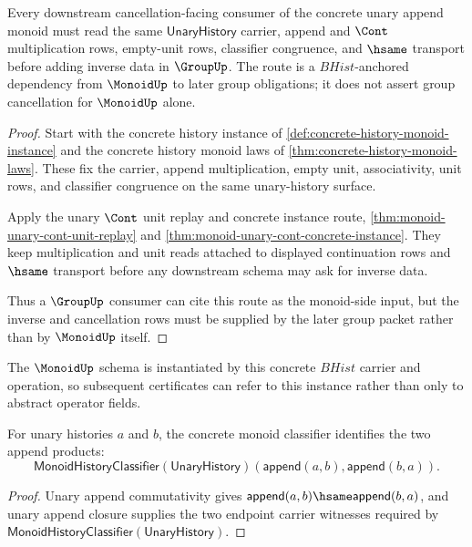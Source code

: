 \begin{theorem}
\label{thm:monoid-unary-cont-cancellation-route}
Every downstream cancellation-facing consumer of the concrete unary append monoid must read the same $\mathsf{UnaryHistory}$ carrier, append and $\Cont$ multiplication rows, empty-unit rows, classifier congruence, and $\hsame$ transport before adding inverse data in $\GroupUp$. The route is a $BHist$-anchored dependency from $\MonoidUp$ to later group obligations; it does not assert group cancellation for $\MonoidUp$ alone.
\end{theorem}
\begin{proof}
Start with the concrete history instance of \autoref{def:concrete-history-monoid-instance} and the concrete history monoid laws of \autoref{thm:concrete-history-monoid-laws}. These fix the carrier, append multiplication, empty unit, associativity, unit rows, and classifier congruence on the same unary-history surface.

Apply the unary $\Cont$ unit replay and concrete instance route, \autoref{thm:monoid-unary-cont-unit-replay} and \autoref{thm:monoid-unary-cont-concrete-instance}. They keep multiplication and unit reads attached to displayed continuation rows and $\hsame$ transport before any downstream schema may ask for inverse data.

Thus a $\GroupUp$ consumer can cite this route as the monoid-side input, but the inverse and cancellation rows must be supplied by the later group packet rather than by $\MonoidUp$ itself.
\end{proof}

The $\MonoidUp$ schema is instantiated by this concrete $BHist$ carrier and
operation, so subsequent certificates can refer to this instance rather than
only to abstract operator fields.

\begin{theorem}
\label{thm:unary-append-monoid-commutative-classifier}
For unary histories $a$ and $b$, the concrete monoid classifier identifies the
two append products:
$$
\mathsf{MonoidHistoryClassifier}(\mathsf{UnaryHistory})
(\mathsf{append}(a,b),\mathsf{append}(b,a)).
$$
\end{theorem}
\begin{proof}
Unary append commutativity gives
$\mathsf{append}(a,b)\hsame\mathsf{append}(b,a)$, and unary append closure
supplies the two endpoint carrier witnesses required by
$\mathsf{MonoidHistoryClassifier}(\mathsf{UnaryHistory})$.
\end{proof}

